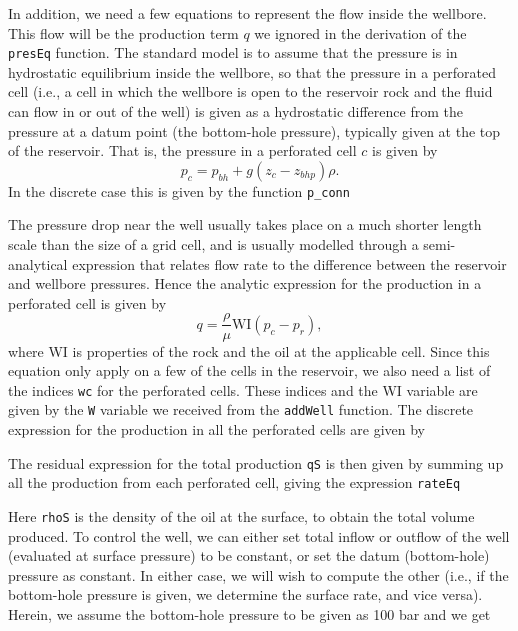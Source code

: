 In addition, we need a few equations to represent the flow inside the wellbore. This flow will be the production term $q$ we ignored in the derivation of the \texttt{presEq} function. The standard model is to assume that the pressure is in hydrostatic equilibrium inside the wellbore, so that the pressure in a perforated cell (i.e., a cell in which the wellbore is open to the reservoir rock and the fluid can flow in or out of the well) is given as a hydrostatic difference from the pressure at a datum point (the bottom-hole pressure), typically given at the top of the reservoir. That is, the pressure in a perforated cell $c$ is given by
\begin{equation*}
p_c = p_{bh} + g (z_c - z_{bhp})\rho.    
\end{equation*}
In the discrete case this is given by the function \texttt{p\_conn}

The pressure drop near the well usually takes place on a much shorter length scale than the size of a grid cell, and is usually modelled through a semi-analytical expression that relates flow rate to the difference between the reservoir and wellbore pressures. Hence the analytic expression for the production in a perforated cell is given by
\begin{equation*}
    q = \frac{\rho}{\mu}\mbox{WI}(p_c - p_r),
\end{equation*}
where \mbox{WI} is properties of the rock and the oil at the applicable cell. Since this equation only apply on a few of the cells in the reservoir, we also need a list of the indices \texttt{wc} for the perforated cells. These indices and the \mbox{WI} variable are given by the \texttt{W} variable we received from the \texttt{addWell} function. The discrete expression for the production in all the perforated cells are given by

The residual expression for the total production \texttt{qS} is then given by summing up all the production from each perforated cell, giving the expression \texttt{rateEq}

Here \texttt{rhoS} is the density of the oil at the surface, to obtain the total volume produced. To control the well, we can either set total inflow or outflow of the well (evaluated at surface pressure) to be constant, or set the datum (bottom-hole) pressure as constant. In either case, we will wish to compute the other (i.e., if the bottom-hole pressure is given, we determine the surface rate, and vice versa). Herein, we assume the bottom-hole pressure to be given as 100 bar and we get

